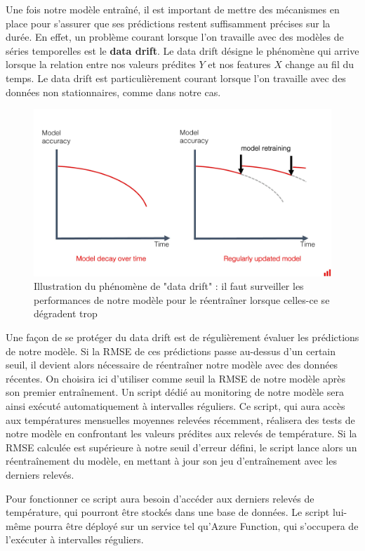 \documentclass[french]{article}
\begin{document}
    Une fois notre modèle entraîné, il est important de mettre des mécanismes en place pour s'assurer que ses prédictions restent suffisamment précises sur la durée. En effet, un problème courant lorsque l'on travaille avec des modèles de séries temporelles est le \textbf{data drift}. Le data drift désigne le phénomène qui arrive lorsque la relation entre nos valeurs prédites $Y$ et nos features $X$ change au fil du temps. Le data drift est particulièrement courant lorsque l'on travaille avec des données non stationnaires, comme dans notre cas.
    \begin{figure}[h]
        \includegraphics[width=12cm]{data_drift}
        \centering
        \caption{Illustration du phénomène de "data drift" : il faut surveiller les performances de notre modèle pour le réentraîner lorsque celles-ce se dégradent trop}
        \centering
    \end{figure}
    Une façon de se protéger du data drift est de régulièrement évaluer les prédictions de notre modèle. Si la RMSE de ces prédictions passe au-dessus d'un certain seuil, il devient alors nécessaire de réentraîner notre modèle avec des données récentes. On choisira ici d'utiliser comme seuil la RMSE de notre modèle après son premier entraînement. Un script dédié au monitoring de notre modèle sera ainsi exécuté automatiquement à intervalles réguliers. Ce script, qui aura accès aux températures mensuelles moyennes relevées récemment, réalisera des tests de notre modèle en confrontant les valeurs prédites aux relevés de température. Si la RMSE calculée est supérieure à notre seuil d'erreur défini, le script lance alors un réentraînement du modèle, en mettant à jour son jeu d'entraînement avec les derniers relevés.
    
    Pour fonctionner ce script aura besoin d'accéder aux derniers relevés de température, qui pourront être stockés dans une base de données. Le script lui-même pourra être déployé sur un service tel qu'Azure Function, qui s'occupera de l'exécuter à intervalles réguliers.
\end{document}

